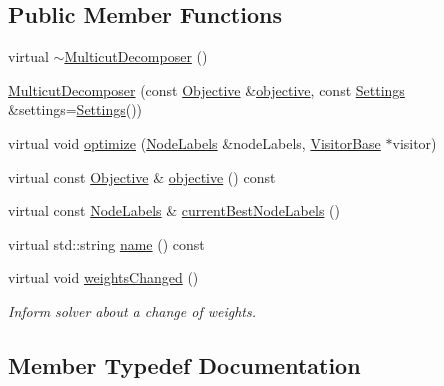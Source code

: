 \subsection*{Public Member Functions}
\begin{DoxyCompactItemize}
\item 
virtual \hyperlink{classnifty_1_1graph_1_1MulticutDecomposer_a152c0efba9d0dabffc85c078874947dc}{$\sim$\+Multicut\+Decomposer} ()
\item 
\hyperlink{classnifty_1_1graph_1_1MulticutDecomposer_aa5abb79427f163f7555b3f120ba865db}{Multicut\+Decomposer} (const \hyperlink{classnifty_1_1graph_1_1MulticutDecomposer_aa365662e75a14ba2d7277243281a0ec2}{Objective} \&\hyperlink{classnifty_1_1graph_1_1MulticutDecomposer_aac4f6435ba5a548a2ce480ccac3b9b61}{objective}, const \hyperlink{structnifty_1_1graph_1_1MulticutDecomposer_1_1Settings}{Settings} \&settings=\hyperlink{structnifty_1_1graph_1_1MulticutDecomposer_1_1Settings}{Settings}())
\item 
virtual void \hyperlink{classnifty_1_1graph_1_1MulticutDecomposer_a9e8365b6c86e51c33425370ae57788d7}{optimize} (\hyperlink{classnifty_1_1graph_1_1MulticutDecomposer_ab3e763da6e04631dabe7655a6642adab}{Node\+Labels} \&node\+Labels, \hyperlink{classnifty_1_1graph_1_1MulticutBase_a5882fb69df59d8113f6a81a0dac26eaa}{Visitor\+Base} $\ast$visitor)
\item 
virtual const \hyperlink{classnifty_1_1graph_1_1MulticutDecomposer_aa365662e75a14ba2d7277243281a0ec2}{Objective} \& \hyperlink{classnifty_1_1graph_1_1MulticutDecomposer_aac4f6435ba5a548a2ce480ccac3b9b61}{objective} () const 
\item 
virtual const \hyperlink{classnifty_1_1graph_1_1MulticutDecomposer_ab3e763da6e04631dabe7655a6642adab}{Node\+Labels} \& \hyperlink{classnifty_1_1graph_1_1MulticutDecomposer_a84b3367efd984ce6188bf87fe0bcb73f}{current\+Best\+Node\+Labels} ()
\item 
virtual std\+::string \hyperlink{classnifty_1_1graph_1_1MulticutDecomposer_a16c2c012e0e14f03acea2f3cfe0d1590}{name} () const 
\item 
virtual void \hyperlink{classnifty_1_1graph_1_1MulticutDecomposer_a769382aa7a3f8cc47515906161f2e38d}{weights\+Changed} ()
\begin{DoxyCompactList}\small\item\em Inform solver about a change of weights. \end{DoxyCompactList}\end{DoxyCompactItemize}


\subsection{Member Typedef Documentation}
\hypertarget{classnifty_1_1graph_1_1MulticutDecomposer_af89f31868f0b51f25e395fdc9b8ce497}{}
